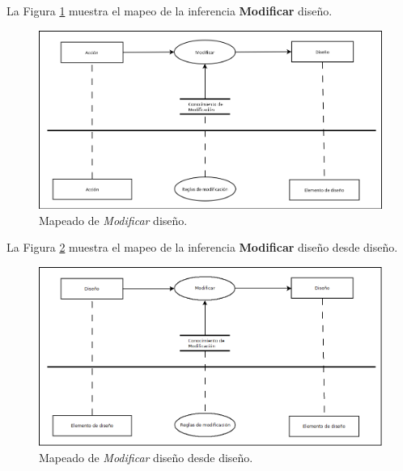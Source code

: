 La Figura \ref{fig:AccionModificaDiseno} muestra el mapeo de la inferencia \textbf{Modificar} diseño.

\begin{figure}[H]
  \centering
  \includegraphics[scale=0.35]{imaxes/AccionModificaDiseno.png}
  \caption{\label{fig:AccionModificaDiseno}Mapeado de \textit{Modificar} diseño.}
\end{figure}

La Figura \ref{fig:DisenoModificarDiseno} muestra el mapeo de la inferencia \textbf{Modificar} diseño desde diseño.

\begin{figure}[H]
  \centering
  \includegraphics[scale=0.35]{imaxes/DisenoModificarDiseno.png}
  \caption{\label{fig:DisenoModificarDiseno}Mapeado de \textit{Modificar} diseño desde diseño.}
\end{figure}